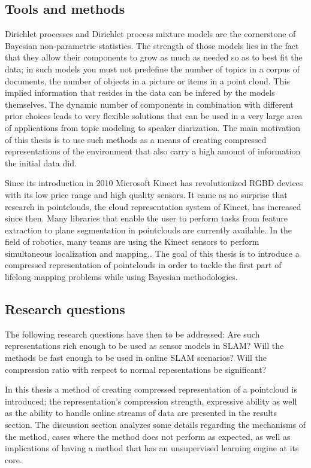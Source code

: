 \documentclass[twoside,hidelinks]{article}
\begin{document}
\subsection{Tools and methods}
Dirichlet processes and Dirichlet process mixture models \cite{nonParam} are the cornerstone of Bayesian non-parametric statistics. The strength of those models lies in the fact that they allow their components to grow as much as needed so as to best fit the data; in such models you must not predefine the number of topics in a corpus of documents, the number of objects in a picture or items in a point cloud. This implied information that resides in the data can be infered by the models themselves. The dynamic number of components in combination with different prior choices leads to very flexible solutions that can be used in a very large area of applications from topic modeling\cite{LDA} to speaker diarization\cite{speakerDiar}.
The main motivation of this thesis is to use such methods as a means of creating compressed representations of the environment that also carry a high amount of information the initial data did. 

Since its introduction in 2010 Microsoft Kinect\cite{kinect} has revolutionized RGBD devices with its low price range and high quality sensors. It came as no surprise that research in pointclouds, the cloud representation system of Kinect, has increased since then. Many libraries that enable the user to perform tasks from feature extraction to plane segmentation\cite{pcl} in pointclouds are currently available. In the field of robotics, many teams are using the Kinect sensors to perform simultaneous localization and mapping\cite{rtabmap},\cite{rgbdmapping}. The goal of this thesis is to introduce a compressed representation of pointclouds in order to tackle the first part of lifelong mapping problems while using Bayesian methodologies. 


\subsection{Research questions}


The following research questions have then to be addressed: Are such representations rich enough to be used as sensor models in SLAM?  Will the methods be fast enough to be used in online SLAM scenarios? Will the compression ratio with respect to normal repesentations be significant? 

In this thesis a method of creating compressed representation of a pointcloud is introduced; the representation's compression strength, expressive ability as well as the ability to handle online streams of data are presented in the results section. The discussion section analyzes some details regarding the mechanisms of the method, cases where the method does not perform as expected, as well as implications of having a method that has an unsupervised learning engine at its core.
\end{document}
